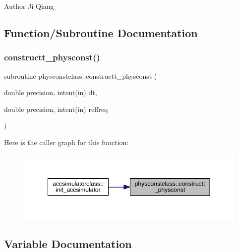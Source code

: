 \begin{DoxyAuthor}{Author}
Ji Qiang 
\end{DoxyAuthor}


\subsection{Function/\+Subroutine Documentation}
\mbox{\label{namespacephysconstclass_a9363467b39854297442c284c2c9fbe07}} 
\subsubsection{\texorpdfstring{constructt\_physconst()}{constructt\_physconst()}}
{\footnotesize\ttfamily subroutine physconstclass\+::constructt\+\_\+physconst (\begin{DoxyParamCaption}\item[{double precision, intent(in)}]{dt,  }\item[{double precision, intent(in)}]{reffreq }\end{DoxyParamCaption})}

Here is the caller graph for this function\+:\nopagebreak
\begin{figure}[H]
\begin{center}
\leavevmode
\includegraphics[width=349pt]{namespacephysconstclass_a9363467b39854297442c284c2c9fbe07_icgraph}
\end{center}
\end{figure}


\subsection{Variable Documentation}
\mbox{\label{namespacephysconstclass_a8622c3bd03bb3706b061386b694c8f71}} 
